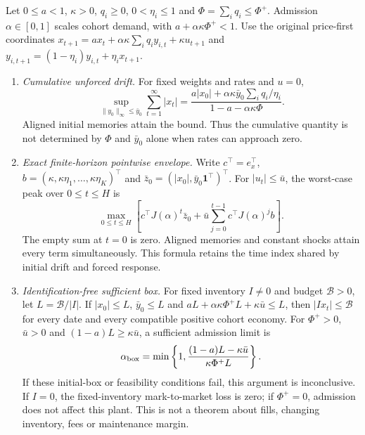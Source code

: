 \begin{proposition}\label{prop:driftguard}
Let $0\le a<1$, $\kappa>0$, $q_i\ge0$, $0<\eta_i\le1$ and $\Phi=\sum_iq_i\le\Phi^+$. Admission $\alpha\in[0,1]$ scales cohort demand, with $a+\alpha\kappa\Phi^+<1$. Use the original price-first coordinates $x_{t+1}=ax_t+\alpha\kappa\sum_iq_iy_{i,t}+\kappa u_{t+1}$ and $y_{i,t+1}=(1-\eta_i)y_{i,t}+\eta_ix_{t+1}$.
\begin{enumerate}[label=(\roman*)]
\item \emph{Cumulative unforced drift.} For fixed weights and rates and $u=0$,
\begin{equation}\label{eq:driftenv}
\sup_{\|y_0\|_\infty\le\bar y_0}\sum_{t=1}^\infty|x_t|
=\frac{a|x_0|+\alpha\kappa\bar y_0\sum_iq_i/\eta_i}{1-a-\alpha\kappa\Phi}.
\end{equation}
Aligned initial memories attain the bound. Thus the cumulative quantity is not determined by $\Phi$ and $\bar y_0$ alone when rates can approach zero.
\item \emph{Exact finite-horizon pointwise envelope.} Write $c^\top=e_x^\top$, $b=(\kappa,\kappa\eta_1,\ldots,\kappa\eta_K)^\top$ and $\bar z_0=(|x_0|,\bar y_0\mathbf1^\top)^\top$. For $|u_t|\le\bar u$, the worst-case peak over $0\le t\le H$ is
\begin{equation}\label{eq:driftpeak}
\max_{0\le t\le H}\left[c^\top J(\alpha)^t\bar z_0+\bar u\sum_{j=0}^{t-1}c^\top J(\alpha)^jb\right].
\end{equation}
The empty sum at $t=0$ is zero. Aligned memories and constant shocks attain every term simultaneously. This formula retains the time index shared by initial drift and forced response.
\item \emph{Identification-free sufficient box.} For fixed inventory $I\ne0$ and budget $\mathcal B>0$, let $L=\mathcal B/|I|$. If $|x_0|\le L$, $\bar y_0\le L$ and $aL+\alpha\kappa\Phi^+L+\kappa\bar u\le L$, then $|I x_t|\le\mathcal B$ for every date and every compatible positive cohort economy. For $\Phi^+>0$, $\bar u>0$ and $(1-a)L\ge\kappa\bar u$, a sufficient admission limit is
\begin{equation}\label{eq:alphabox}
\alpha_{\rm box}=\min\left\{1,\frac{(1-a)L-\kappa\bar u}{\kappa\Phi^+L}\right\}.
\end{equation}
If these initial-box or feasibility conditions fail, this argument is inconclusive. If $I=0$, the fixed-inventory mark-to-market loss is zero; if $\Phi^+=0$, admission does not affect this plant. This is not a theorem about fills, changing inventory, fees or maintenance margin.
\end{enumerate}
\end{proposition}

